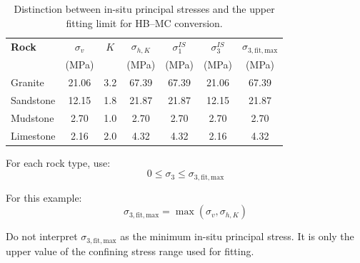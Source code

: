 \begin{table}[H]
\centering
\small
\begin{tabular}{l c c c c c c}
\toprule
\textbf{Rock} & \(\sigma_v\) & \(K\) & \(\sigma_{h,K}\) & \(\sigma_1^{IS}\) & \(\sigma_3^{IS}\) & \(\sigma_{3,\mathrm{fit,max}}\) \\
 & (MPa) & & (MPa) & (MPa) & (MPa) & (MPa) \\
\midrule
Granite & 21.06 & 3.2 & 67.39 & 67.39 & 21.06 & 67.39 \\
Sandstone & 12.15 & 1.8 & 21.87 & 21.87 & 12.15 & 21.87 \\
Mudstone & 2.70 & 1.0 & 2.70 & 2.70 & 2.70 & 2.70 \\
Limestone & 2.16 & 2.0 & 4.32 & 4.32 & 2.16 & 4.32 \\
\bottomrule
\end{tabular}
\caption{Distinction between in-situ principal stresses and the upper fitting limit for HB--MC conversion.}
\end{table}

\begin{calcbox}
For each rock type, use:
\[
0 \leq \sigma_3 \leq \sigma_{3,\mathrm{fit,max}}
\]

For this example:
\[
\sigma_{3,\mathrm{fit,max}}=\max(\sigma_v,\sigma_{h,K})
\]

Do not interpret \(\sigma_{3,\mathrm{fit,max}}\) as the minimum in-situ principal stress.
It is only the upper value of the confining stress range used for fitting.
\end{calcbox}

